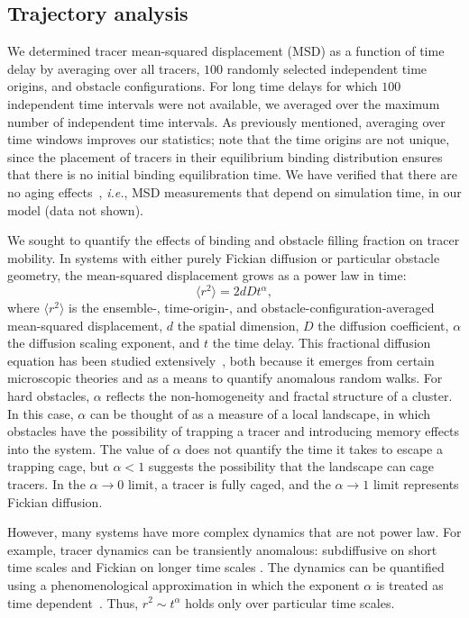 \subsection{Trajectory analysis}

We determined tracer mean-squared displacement (MSD) as a function of time delay
by averaging over all tracers, $ 100 $ randomly selected independent time
origins, and obstacle configurations. For long time delays for which $100$
independent time intervals were not available, we averaged over the maximum
number of independent time intervals. As previously mentioned, averaging over
time windows improves our statistics; note that the time origins are not unique,
since the placement of tracers in their equilibrium binding distribution ensures
that there is no initial binding equilibration time.  We have verified that
there are no aging effects~\cite{magdziarz_fractional_09, schulz_aging_14},
\textit{i.e.}, MSD measurements that depend on simulation time, in our model
(data not shown).
 
We sought to quantify the effects of binding and obstacle filling fraction on
tracer mobility.  In systems with either purely Fickian diffusion or particular
obstacle geometry, the mean-squared displacement grows as a power law in time:
%
\begin{equation}
  \label{eqn:msd_anom_full}
  \langle r^2 \rangle =  2dD t ^ {\alpha},
\end{equation}
%
where $\langle r^2 \rangle$ is the ensemble-, time-origin-, and
obstacle-configuration-averaged mean-squared displacement, $d$ the spatial
dimension, $D$ the diffusion coefficient, $\alpha$ the diffusion scaling
exponent, and $t$ the time delay. This fractional diffusion equation has been
studied extensively~\cite{metzler_random_00}, both because it emerges from
certain microscopic theories and as a means to quantify anomalous random walks.
For hard obstacles, $ \alpha $ reflects the non-homogeneity and fractal
structure of a cluster. In this case, $\alpha$ can be thought of as a measure of
a local landscape, in which obstacles have the possibility of trapping a tracer
and introducing memory effects into the system. The value of $\alpha$ does not
quantify the time it takes to escape a trapping cage, but $\alpha < 1$ suggests
the possibility that the landscape can cage tracers.  In the $\alpha \rightarrow
0$ limit, a tracer is fully caged, and the $\alpha \rightarrow 1 $ limit
represents Fickian diffusion.

However, many systems have more complex dynamics that are not power law.  For
example, tracer dynamics can be transiently anomalous: subdiffusive on short
time scales and Fickian on longer time scales .  The
dynamics can be quantified using a phenomenological approximation in which the
exponent $\alpha$ is treated as time dependent~\cite{saxton_anomalous_94,
  saxton_singleparticle_97, ellery_characterizing_14, ellery_calculating_15,
  ellery_communication_16, ellery_modeling_16}.  Thus, $ r^2 \sim t^{\alpha} $
holds only over particular time scales.

